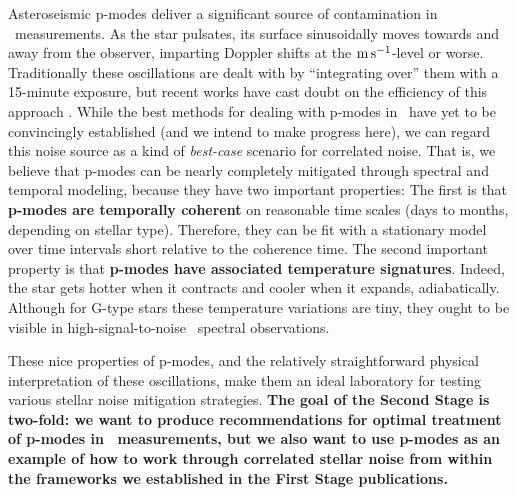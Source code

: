 \documentclass[12pt, letterpaper]{article}
\begin{document}
Asteroseismic p-modes deliver a significant source of contamination in \EPRV\
measurements. 
As the star pulsates, its surface sinusoidally moves towards and away from
the observer, imparting Doppler shifts at the ${\mathrm{m\,s^{-1}}}$-level or worse.
Traditionally these oscillations are dealt with by ``integrating over'' them
with a 15-minute exposure, but recent works have cast doubt on the efficiency 
of this approach \citep{Medina2018, Chaplin2019}. 
While the best methods for dealing with p-modes in \EPRV\ have yet 
to be convincingly established (and we intend to make progress here),
we can regard this noise source as a kind of
\textit{best-case} scenario for correlated noise. That is, we believe that 
p-modes can be nearly completely mitigated through spectral and temporal modeling, 
because they have two important properties:
The first is that
\textbf{p-modes are temporally coherent} on reasonable time scales (days to months, depending on
stellar type). Therefore, they can be fit with a stationary model over time intervals 
short relative to the coherence time. 
The second important property is that
\textbf{p-modes have associated temperature signatures}. Indeed, the star gets
hotter when it contracts and cooler when it expands, adiabatically. Although for
G-type stars these temperature variations are tiny, they ought to be visible in
high-signal-to-noise \EPRV\ spectral observations.

These nice properties of p-modes, and the relatively straightforward physical 
interpretation of these oscillations, make them an ideal laboratory for testing
various stellar noise mitigation strategies. \textbf{The goal of the Second Stage is 
two-fold: we want to produce recommendations for optimal treatment of p-modes
in \EPRV\ measurements, but we also want to use p-modes as an 
example of how to work through correlated stellar noise from within the 
frameworks we established in the First Stage publications.}
\end{document}
